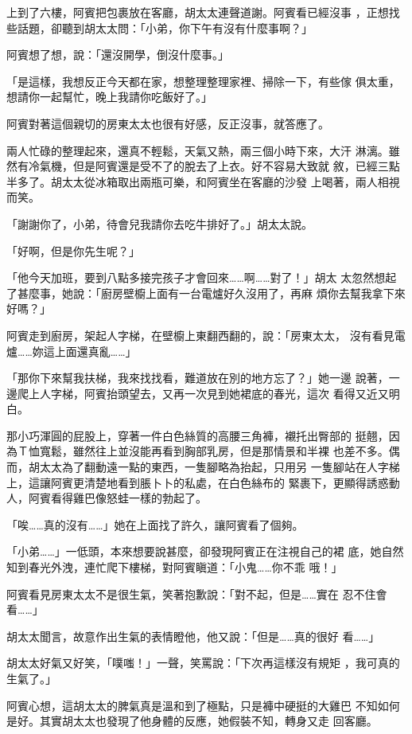 上到了六樓，阿賓把包裹放在客廳，胡太太連聲道謝。阿賓看已經沒事
，正想找些話題，卻聽到胡太太問：「小弟，你下午有沒有什麼事啊？」

阿賓想了想，說：「還沒開學，倒沒什麼事。」

「是這樣，我想反正今天都在家，想整理整理家裡、掃除一下，有些傢
俱太重，想請你一起幫忙，晚上我請你吃飯好了。」

阿賓對著這個親切的房東太太也很有好感，反正沒事，就答應了。

兩人忙碌的整理起來，還真不輕鬆，天氣又熱，兩三個小時下來，大汗
淋漓。雖然有冷氣機，但是阿賓還是受不了的脫去了上衣。好不容易大致就
敘，已經三點半多了。胡太太從冰箱取出兩瓶可樂，和阿賓坐在客廳的沙發
上喝著，兩人相視而笑。

「謝謝你了，小弟，待會兒我請你去吃牛排好了。」胡太太說。

「好啊，但是你先生呢？」

「他今天加班，要到八點多接完孩子才會回來……啊……對了！」胡太
太忽然想起了甚麼事，她說：「廚房壁櫥上面有一台電爐好久沒用了，再麻
煩你去幫我拿下來好嗎？」

阿賓走到廚房，架起人字梯，在壁櫥上東翻西翻的，說：「房東太太，
沒有看見電爐……妳這上面還真亂……」

「那你下來幫我扶梯，我來找找看，難道放在別的地方忘了？」她一邊
說著，一邊爬上人字梯，阿賓抬頭望去，又再一次見到她裙底的春光，這次
看得又近又明白。

那小巧渾圓的屁股上，穿著一件白色絲質的高腰三角褲，襯托出臀部的
挺翹，因為Ｔ恤寬鬆，雖然往上並沒能再看到胸部乳房，但是那情景和半裸
也差不多。偶而，胡太太為了翻動遠一點的東西，一隻腳略為抬起，只用另
一隻腳站在人字梯上，這讓阿賓更清楚地看到脹卜卜的私處，在白色絲布的
緊裹下，更顯得誘惑動人，阿賓看得雞巴像怒蛙一樣的勃起了。

「唉……真的沒有……」她在上面找了許久，讓阿賓看了個夠。

「小弟……」一低頭，本來想要說甚麼，卻發現阿賓正在注視自己的裙
底，她自然知到春光外洩，連忙爬下樓梯，對阿賓瞋道：「小鬼……你不乖
哦！」

阿賓看見房東太太不是很生氣，笑著抱歉說：「對不起，但是……實在
忍不住會看……」

胡太太聞言，故意作出生氣的表情瞪他，他又說：「但是……真的很好
看……」

胡太太好氣又好笑，「噗嗤！」一聲，笑罵說：「下次再這樣沒有規矩
，我可真的生氣了。」

阿賓心想，這胡太太的脾氣真是溫和到了極點，只是褲中硬挺的大雞巴
不知如何是好。其實胡太太也發現了他身體的反應，她假裝不知，轉身又走
回客廳。

